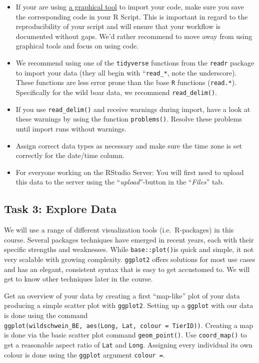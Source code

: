 \documentclass[]{book}
\providecommand{\tightlist}{%
  \setlength{\itemsep}{0pt}\setlength{\parskip}{0pt}}
\begin{document}
\begin{itemize}
\tightlist
\item
  If your are using
  \href{https://support.rstudio.com/hc/en-us/articles/218611977-Importing-Data-with-RStudio}{a
  graphical tool} to import your code, make sure you save the
  corresponding code in your R Script. This is important in regard to
  the reproducibility of your script and will ensure that your workflow
  is documented without gaps. We'd rather recommend to move away from
  using graphical tools and focus on using code.
\item
  We recommend using one of the \texttt{tidyverse} functions from the
  \texttt{readr} package to import your data (they all begin with
  ``\texttt{read\_*}, note the underscore). These functions are less
  error prone than the base \texttt{R} functions (\texttt{read.*}).
  Specifically for the wild boar data, we recommend
  \texttt{read\_delim()}.
\item
  If you use \texttt{read\_delim()} and receive warnings during import,
  have a look at these warnings by using the function
  \texttt{problems()}. Resolve these problems until import runs without
  warnings.
\item
  Assign correct data types as necessary and make sure the time zone is
  set correctly for the date/time column.
\item
  For everyone working on the RStudio Server: You will first need to
  upload this data to the server using the ``\emph{upload}''-button in
  the ``\emph{Files}'' tab.
\end{itemize}

\subsection{Task 3: Explore Data}\label{task-3-explore-data}

We will use a range of different visualization tools (i.e.~R-packages)
in this course. Several packages techniques have emerged in recent
years, each with their specific strengths and weaknesses. While
\texttt{base::plot()}is quick and simple, it not very scalable with
growing complexity. \texttt{ggplot2} offers solutions for most use cases
and has an elegant, consistent syntax that is easy to get accustomed to.
We will get to know other techniques later in the course.

Get an overview of your data by creating a first ``map-like'' plot of
your data producing a simple scatter plot with \texttt{ggplot2}. Setting
up a \texttt{ggplot} with our data is done using the command
\texttt{ggplot(wildschwein\_BE,\ aes(Long,\ Lat,\ colour\ =\ TierID))}.
Creating a map is done via the basic scatter plot command
\texttt{geom\_point()}. Use \texttt{coord\_map()} to get a reasonable
aspect ratio of \texttt{Lat} and \texttt{Long}. Assigning every
individual its own colour is done using the \texttt{ggplot} argument
\texttt{colour\ =}.
\end{document}
